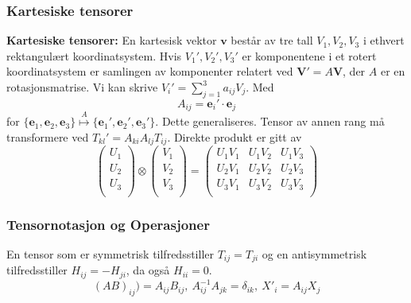 \documentclass[a4paper, norsk, 8pt]{article}
\begin{document}
\begin{multicols*}{2}
\subsubsection*{\small Kartesiske tensorer}
\textbf{Kartesiske tensorer:} En kartesisk vektor $\mathbf{v}$ består av tre tall $V_1,V_2,V_3$ i ethvert rektangulært koordinatsystem. Hvis $V_1',V_2',V_3'$ er komponentene i et rotert koordinatsystem er samlingen av komponenter relatert ved $\mathbf{V'}=A\mathbf{V}$, der $A$ er en rotasjonsmatrise. Vi kan skrive $V_i'=\sum_{j=1}^3 a_{ij}V_j$. Med \[A_{ij}=\mathbf{e}_i'\cdot \mathbf{e}_j\] for $\{\mathbf{e}_1,\mathbf{e}_2,\mathbf{e}_3 \}\overset{A}{\mapsto}\{\mathbf{e}_1',\mathbf{e}_2',\mathbf{e}_3'  \}$. Dette generaliseres. Tensor av annen rang må transformere ved $T_{kl}'=A_{ki}A_{lj}T_{ij}$. Direkte produkt er gitt av 
\[
\left(\begin{matrix}
U_1 \\ U_2 \\ U_3 \\
\end{matrix}\right)
\otimes
\left(\begin{matrix}
V_1 \\ V_2 \\ V_3 \\
\end{matrix}\right)
=
\left(\begin{matrix}
U_1V_1 & U_1V_2 & U_1V_3 \\
U_2V_1 & U_2V_2 & U_2V_3 \\
U_3V_1 & U_3V_2 & U_3V_3 \\
\end{matrix}\right)
\]

\subsubsection*{\small Tensornotasjon og Operasjoner}
En tensor som er symmetrisk tilfredsstiller $T_{ij}=T_{ji}$ og en antisymmetrisk tilfredsstiller $H_{ij}=-H_{ji}$, da også $H_{ii}=0$. \\
\[
(AB)_{ij})=A_{ij}B_{ij}, \ A^{-1}_{ij}A_{jk}=\delta_{ik}, \ X'_{i} = A_{ij}X_{j}
\]


\end{multicols*}
\end{document}
